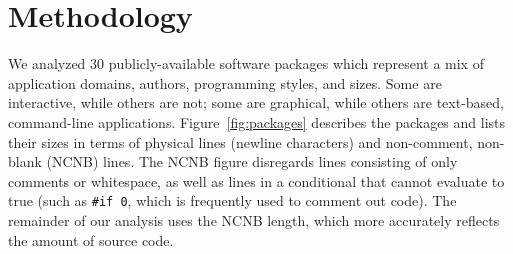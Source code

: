 \documentclass[10pt]{article}
\def\numpackages{30}
\begin{document}
%
%
%
%






\section{Methodology}
\label{sec:methodology}

We analyzed {\numpackages} publicly-available software packages which
represent a mix of application domains, authors, programming styles, and
sizes.  Some are interactive, while others are not; some are graphical,
while others are text-based, command-line applications.
Figure~\ref{fig:packages} describes the packages and lists their sizes in
terms of physical lines (newline characters) and non-comment, non-blank
(NCNB) lines.  The NCNB figure disregards lines consisting of only comments
or whitespace, as well as lines in a conditional that cannot evaluate to
true (such as {\tt \#if 0}, which is frequently used to comment out code).  The
remainder of our analysis uses the NCNB length, which more accurately
reflects the amount of source code.
\end{document}
